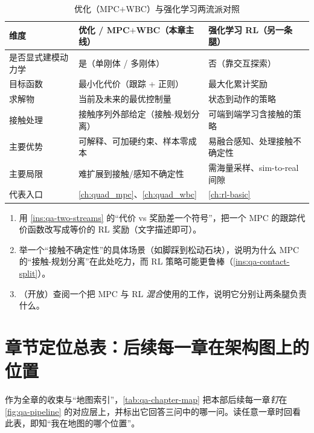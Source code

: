 \begin{table}[H]\centering\small
\caption{优化（MPC$+$WBC）与强化学习两流派对照}
\begin{tabularx}{\linewidth}{p{} L L}
\toprule
维度 & 优化 / MPC$+$WBC（本章主线） & 强化学习 RL（另一条腿） \\
\midrule
是否显式建模动力学 & 是（单刚体 / 多刚体） & 否（靠交互探索） \\
目标函数 & 最小化代价（跟踪 + 正则） & 最大化累计奖励 \\
求解物 & 当前及未来的最优控制量 & 状态到动作的策略 \\
接触处理 & 接触序列外部给定（接触-规划分离） & 可端到端学习含接触的策略 \\
主要优势 & 可解释、可加硬约束、样本零成本 & 易融合感知、处理接触不确定性 \\
主要局限 & 难扩展到接触/感知不确定性 & 需海量采样、sim-to-real 间隙 \\
代表入口 & \cref{ch:quad_mpc}、\cref{ch:quad_wbc} & \cref{ch:rl-basic} \\
\bottomrule
\end{tabularx}
\label{tab:qa-two-streams}
\end{table}

\begin{practice}
\begin{enumerate}
  \item 用 \cref{ins:qa-two-streams} 的“代价 vs 奖励差一个符号”，把一个 MPC 的跟踪代价函数改写成等价的 RL 奖励（文字描述即可）。
  \item 举一个“接触不确定性”的具体场景（如脚踩到松动石块），说明为什么 MPC 的“接触-规划分离”在此处吃力，而 RL 策略可能更鲁棒（\cref{ins:qa-contact-split}）。
  \item （开放）查阅一个把 MPC 与 RL \emph{混合}使用的工作，说明它分别让两条腿负责什么。
\end{enumerate}
\end{practice}

\section{章节定位总表：后续每一章在架构图上的位置}
\label{sec:qa-map}

作为全章的收束与“地图索引”，\cref{tab:qa-chapter-map} 把本部后续每一章\emph{钉}在 \cref{fig:qa-pipeline} 的对应层上，并标出它回答三问中的哪一问。读任意一章时回看此表，即知“我在地图的哪个位置”。

